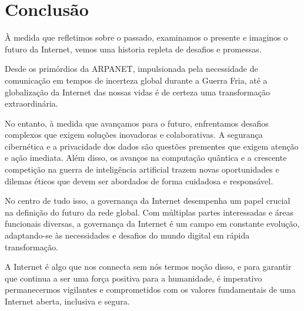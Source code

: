 \section{Conclusão}
À medida que refletimos sobre o passado, examinamos o presente e imaginos o futuro 
da Internet, vemos uma historia repleta de desafios e promessas. 

Desde os primórdios da ARPANET, impulsionada pela necessidade de comunicação em tempos de 
incerteza global durante a Guerra Fria, até a globalização da Internet das nossas vidas 
é de certeza uma transformação extraordinária.

No entanto, à medida que avançamos para o futuro, enfrentamos desafios complexos que 
exigem soluções inovadoras e colaborativas. A segurança cibernética e a privacidade dos 
dados são questões prementes que exigem atenção e ação imediata.
Além disso, os avanços na computação quântica e a crescente competição na guerra de 
inteligência artificial trazem novas oportunidades e dilemas éticos que devem ser abordados 
de forma cuidadosa e responsável.

No centro de tudo isso, a governança da Internet desempenha um papel crucial na 
definição do futuro da rede global. Com múltiplas partes interessadas e áreas funcionais 
diversas, a governança da Internet é um campo em constante evolução, adaptando-se às 
necessidades e desafios do mundo digital em rápida transformação.

A Internet é algo que nos connecta sem nós termos noção disso, e para garantir que continua 
a ser uma força positiva para a humanidade, é imperativo permanecermos vigilantes 
e comprometidos com os valores fundamentais de uma Internet aberta, inclusiva e segura.